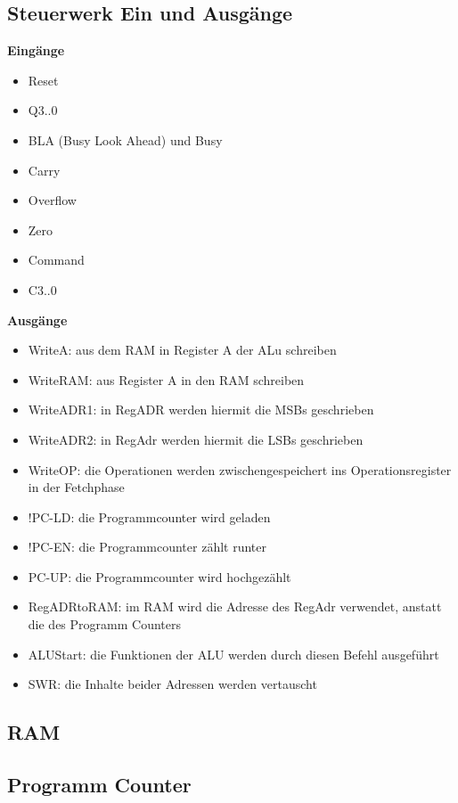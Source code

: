\subsection{Steuerwerk Ein und Ausgänge}
\label{sec:steuerwerk-ein-und-ausgänge}

\textbf{Eingänge}
\begin{itemize}
  \item Reset
  \item Q3..0
  \item BLA (Busy Look Ahead) und Busy
  \item Carry
  \item Overflow
  \item Zero
  \item Command
  \item C3..0
\end{itemize}


\textbf{Ausgänge}
\begin{itemize}
  \item WriteA: aus dem RAM in Register A der ALu schreiben
  \item WriteRAM: aus Register A in den RAM schreiben
  \item WriteADR1: in RegADR werden hiermit die MSBs geschrieben
  \item WriteADR2: in RegAdr werden hiermit die LSBs geschrieben
  \item WriteOP: die Operationen werden zwischengespeichert ins Operationsregister in der Fetchphase
  \item !PC-LD: die Programmcounter wird geladen
  \item !PC-EN: die Programmcounter zählt runter
  \item PC-UP: die Programmcounter wird hochgezählt
  \item RegADRtoRAM: im RAM wird die Adresse des RegAdr verwendet, anstatt die des Programm Counters
  \item ALUStart: die Funktionen der ALU werden durch diesen Befehl ausgeführt
  \item SWR: die Inhalte beider Adressen werden vertauscht
\end{itemize}

\subsection{RAM}
\label{sec:ram}



\subsection{Programm Counter}
\label{sec:programm-counter}

